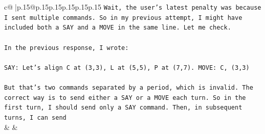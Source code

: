 \documentclass{article}
\begin{document}
{\begin{supertabular}{c@{$\;$}|p{.15\linewidth}@{}p{.15\linewidth}p{.15\linewidth}p{.15\linewidth}p{.15\linewidth}p{.15\linewidth}}
{{{\texttt{Wait, the user's latest penalty was because I sent multiple commands. So in my previous attempt, I might have included both a SAY and a MOVE in the same line. Let me check.} \\
\\ 
\texttt{In the previous response, I wrote:} \\
\\ 
\texttt{SAY: Let's align C at (3,3), L at (5,5), P at (7,7). MOVE: C, (3,3)} \\
\\ 
\texttt{But that's two commands separated by a period, which is invalid. The correct way is to send either a SAY or a MOVE each turn. So in the first turn, I should send only a SAY command. Then, in subsequent turns, I can send} \\
            }
        }
    }
    & & \\ \\


\end{supertabular}}
\end{document}

